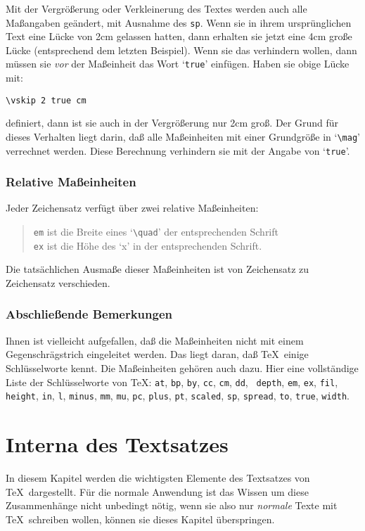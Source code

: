 Mit der Vergr\"o\ss{}erung oder Verkleinerung des Textes werden auch alle
Ma\ss{}angaben ge\"andert, mit Ausnahme des {\tt sp}. Wenn sie in ihrem
urspr\"unglichen Text eine L\"ucke von 2cm gelassen hatten, dann erhalten
sie jetzt eine 4cm gro\ss{}e L\"ucke (entsprechend dem letzten Beispiel).
Wenn sie das verhindern wollen, dann m\"ussen sie {\em vor} der
Ma\ss{}einheit das Wort `\verb|true|' einf\"ugen. Haben sie obige L\"ucke mit:
\begin{verbatim}
\vskip 2 true cm
\end{verbatim}
definiert, dann ist sie auch in der Vergr\"o\ss{}erung nur 2cm gro\ss{}. Der
Grund f\"ur dieses Verhalten liegt darin, da\ss{} alle Ma\ss{}einheiten mit
einer Grundgr\"o\ss{}e in 
`\verb|\mag|' verrechnet werden. Diese Berechnung
verhindern sie mit der Angabe von `\verb|true|'.
\subsection{Relative Ma\ss{}einheiten}
Jeder Zeichensatz verf\"ugt \"uber zwei relative Ma\ss{}einheiten:
\begin{quote}
{\tt em} ist die Breite eines 
`\verb|\quad|' der entsprechenden
Schrift\\
{\tt ex} ist die 
H\"ohe des `x' in der entsprechenden Schrift.
\end{quote}
Die tats\"achlichen Ausma\ss{}e dieser Ma\ss{}einheiten ist von Zeichensatz zu
Zeichensatz verschieden.
\subsection{Abschlie\ss{}ende Bemerkungen}
Ihnen ist vielleicht aufgefallen, da\ss{} die Ma\ss{}einheiten nicht mit einem
Gegenschr\"agstrich eingeleitet werden. Das liegt daran, da\ss{} \TeX\
einige 
Schl\"usselworte kennt. Die Ma\ss{}einheiten geh\"oren auch dazu. Hier
eine vollst\"andige 
Liste der Schl\"usselworte von \TeX:
{\tt at}, {\tt bp}, {\tt by}, {\tt cc}, {\tt cm}, {\tt dd}, {\tt
depth}, {\tt em}, {\tt ex}, {\tt fil}, {\tt height}, {\tt in}, {\tt l},
{\tt minus}, {\tt mm}, {\tt mu}, {\tt pc}, {\tt plus},
{\tt pt}, {\tt scaled}, {\tt sp}, {\tt spread}, {\tt to}, {\tt true},
{\tt width}.
\chapter{Interna des Textsatzes}
In diesem Kapitel werden die wichtigsten Elemente des Textsatzes von
\TeX\ dargestellt. F\"ur die normale Anwendung ist das Wissen um diese
Zusammenh\"ange nicht unbedingt n\"otig, wenn sie also nur {\em normale}
Texte mit \TeX\ schreiben wollen, k\"onnen sie dieses Kapitel
\"uberspringen.
